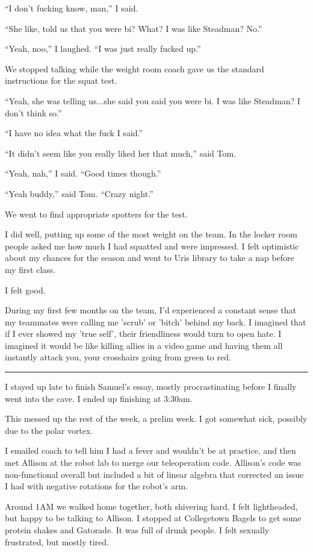 ``I don't fucking know, man,'' I said.

``She like, told us that you were bi?  What?  I was like Steadman?  No.''

``Yeah, noo,'' I laughed. ``I was just really fucked up.''

We stopped talking while the weight room coach gave us the standard instructions
for the squat test.

``Yeah, she was telling us...she said you said you were bi.  I was like
Steadman?  I don't think so.''

``I have no idea what the fuck I said.''

``It didn't seem like you really liked her that much,'' said Tom.

``Yeah, nah,'' I said.  ``Good times though.''

``Yeah buddy,'' said Tom.  ``Crazy night.'' 

We went to find appropriate spotters for the test.

I did well, putting up some of the most weight on the team.  In the locker room
people asked me how much I had squatted and were impressed.  I felt optimistic
about my chances for the season and went to Uris library to take a nap before my
first class.

I felt good.

During my first few months on the team, I'd experienced a constant sense that my
teammates were calling me 'scrub' or 'bitch' behind my back.  I imagined that if
I ever showed my 'true self', their friendliness would turn to open hate.  I
imagined it would be like killing allies in a video game and having them all
instantly attack you, your crosshairs going from green to red. 

\plainfancybreak{12pt}{2}{* * *}

I stayed up late to finish Samuel's essay, mostly procrastinating before I
finally went into the cave.  I ended up finishing at 3:30am.

This messed up the rest of the week, a prelim week.  I got somewhat sick,
possibly due to the polar vortex.

I emailed coach to tell him I had a fever and wouldn't be at practice, and then
met Allison at the robot lab to merge our teleoperation code.   Allison's code
was non-functional overall but included a bit of linear algebra that corrected
an issue I had with negative rotations for the robot's arm.

Around 1AM we walked home together, both shivering hard.  I felt lightheaded,
but happy to be talking to Allison.  I stopped at Collegetown Bagels to get some
protein shakes and Gatorade.  It was full of drunk people.  I felt sexually
frustrated, but mostly tired.

